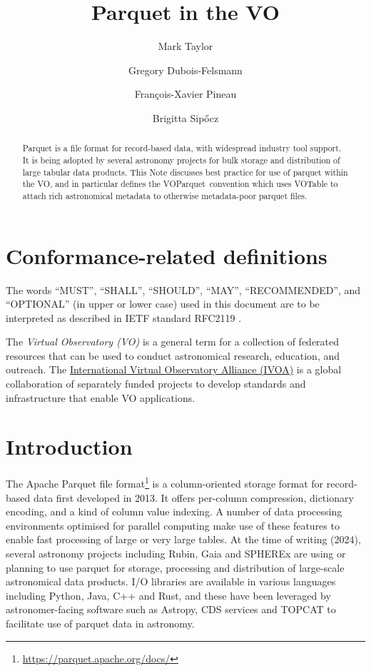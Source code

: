 \documentclass[11pt,a4paper]{ivoa}
\title{Parquet in the VO}
\author[https://wiki.ivoa.net/twiki/bin/view/IVOA/MarkTaylor]
       {Mark Taylor}
\author[https://wiki.ivoa.net/twiki/bin/view/IVOA/GregoryDuboisFelsmann]
       {Gregory Dubois-Felsmann}
\author[https://wiki.ivoa.net/twiki/bin/view/IVOA/FrancoisXavierPineau]
       {Fran\c{c}ois-Xavier Pineau}
\author{Brigitta Sip\H{o}cz}
\newcommand{\voparquet}{VOParquet}
\begin{document}
\begin{abstract}
Parquet is a file format for record-based data,
with widespread industry tool support.
It is being adopted by several astronomy projects for bulk storage and
distribution of large tabular data products.
This Note discusses best practice for use of parquet within the VO,
and in particular defines the \voparquet\ convention
which uses VOTable to attach rich astronomical metadata
to otherwise metadata-poor parquet files.
\end{abstract}

\section*{Conformance-related definitions}

The words ``MUST'', ``SHALL'', ``SHOULD'', ``MAY'', ``RECOMMENDED'', and
``OPTIONAL'' (in upper or lower case) used in this document are to be
interpreted as described in IETF standard RFC2119 \citep{std:RFC2119}.

The \emph{Virtual Observatory (VO)} is a
general term for a collection of federated resources that can be used
to conduct astronomical research, education, and outreach.
The \href{https://www.ivoa.net}{International
Virtual Observatory Alliance (IVOA)} is a global
collaboration of separately funded projects to develop standards and
infrastructure that enable VO applications.


\section{Introduction}
\label{sec:intro}

The Apache Parquet file
format\footnote{\url{https://parquet.apache.org/docs/}}
is a column-oriented storage format for record-based data
first developed in 2013.
It offers per-column compression, dictionary encoding, and
a kind of column value indexing.
A number of data processing environments optimised for parallel
computing make use of these features to enable fast processing
of large or very large tables.
At the time of writing (2024),
several astronomy projects including Rubin, Gaia and SPHEREx
are using or planning to use parquet for storage, processing
and distribution of large-scale astronomical data products.
I/O libraries are available in various languages including Python,
Java, C++ and Rust, and these have been leveraged by astronomer-facing
software such as Astropy, CDS services and TOPCAT to facilitate
use of parquet data in astronomy.
\end{document}
